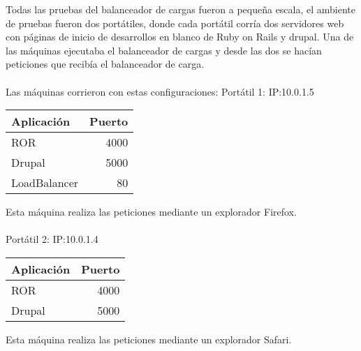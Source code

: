 Todas las pruebas del balanceador de cargas fueron a pequeña escala, el ambiente de pruebas fueron dos portátiles, donde cada portátil corría dos
servidores web con páginas de inicio de desarrollos en blanco de Ruby on Rails y drupal. Una de las máquinas ejecutaba el balanceador de cargas y
desde las dos se hacían peticiones que recibía el balanceador de carga.\\ \\

Las máquinas corrieron con estas configuraciones:
Portátil 1: IP:10.0.1.5
\begin{center}
\begin{tabular}{ l r }
Aplicación & Puerto \\ \hline
ROR &  4000 \\
Drupal  & 5000\\
LoadBalancer & 80 \\
\end{tabular}
\end{center}
Esta máquina realiza las peticiones mediante un explorador Firefox.\\ \\

Portátil 2: IP:10.0.1.4
\begin{center}
\begin{tabular}{ l r }
Aplicación & Puerto \\ \hline
ROR  & 4000 \\
Drupal  & 5000\\
\end{tabular}
\end{center}
Esta máquina realiza las peticiones mediante un explorador Safari.\\ \\